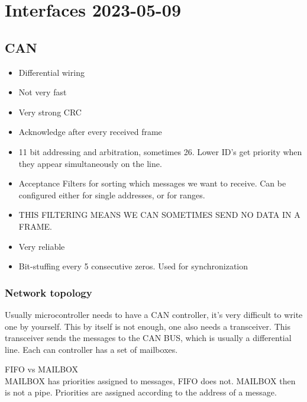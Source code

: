 
\chapter{Interfaces 2023-05-09}


\section{CAN}
\begin{itemize}
        \item Differential wiring 
        \item Not very fast
        \item Very strong CRC
        \item Acknowledge after every received frame
        \item 11 bit addressing and arbitration, sometimes 26. Lower ID's get priority when they appear simultaneously on the line.
        \item  Acceptance Filters for sorting which messages we want to receive. Can be configured either for single addresses, or for ranges.
        \item THIS FILTERING MEANS WE CAN SOMETIMES SEND NO DATA IN A FRAME.
        \item Very reliable
        \item Bit-stuffing every 5 consecutive zeros. Used for synchronization 
        
\end{itemize}

\subsection{Network topology}
Usually microcontroller needs to have a CAN controller, it's very difficult to write one by yourself.
This by itself is not enough, one also needs a transceiver. This transceiver sends the messages to the
CAN BUS, which is usually a differential line.
Each can controller has a set of mailboxes. 

\nt
{
    FIFO vs MAILBOX\\
    MAILBOX has priorities assigned to messages, FIFO does not.
    MAILBOX then is not a pipe. Priorities are assigned according to the address of a message.
}

\clearpage
